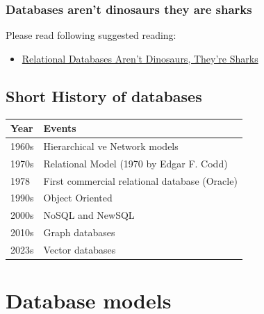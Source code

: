 \documentclass[
  letterpaper,
  DIV=11,
  numbers=noendperiod]{scrreprt}
\providecommand{\tightlist}{%
  \setlength{\itemsep}{0pt}\setlength{\parskip}{0pt}}\usepackage{longtable,booktabs,array}
\begin{document}
\subsection{Databases aren't dinosaurs they are
sharks}\label{databases-arent-dinosaurs-they-are-sharks}

Please read following suggested reading:

\begin{itemize}
\tightlist
\item
  \href{https://www.simplethread.com/relational-databases-arent-dinosaurs-theyre-sharks/}{Relational
  Databases Aren't Dinosaurs, They're Sharks}
\end{itemize}

\section{Short History of databases}\label{short-history-of-databases}

\begin{longtable}[]{@{}ll@{}}
\toprule\noalign{}
Year & Events \\
\midrule\noalign{}
\endhead
\bottomrule\noalign{}
\endlastfoot
1960s & Hierarchical ve Network models \\
1970s & Relational Model (1970 by Edgar F. Codd) \\
1978 & First commercial relational database (Oracle) \\
1990s & Object Oriented \\
2000s & NoSQL and NewSQL \\
2010s & Graph databases \\
2023s & Vector databases \\
\end{longtable}

\chapter{Database models}\label{database-models}
\end{document}
